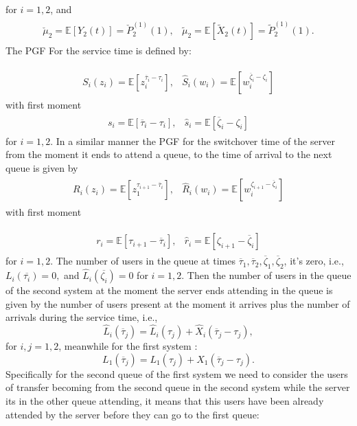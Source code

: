 \documentclass{article}
\newcommand{\esp}{\mathbb{E}}
\begin{document}
for $i=1,2$, and
\begin{eqnarray*} 
\begin{array}{cc}
\check{\mu}_{2}=\esp\left[Y_{2}\left(t\right)\right]=\check{P}_{2}^{(1)}
\left(1\right),&
\tilde{\mu}_{2}=\esp\left[\tilde{X}_{2}\left(t\right)\right]
=\tilde{P}_{2}^{(1)}\left(1\right).
\end{array}
\end{eqnarray*} The PGF For the service time is defined by:

\begin{eqnarray*}
\begin{array}{cc}
S_{i}\left(z_{i}\right)=\esp\left[z_{i}^{\overline{\tau}_{i}-\tau_{i}}
\right], &
\hat{S}_{i}\left(w_{i}\right)=\esp\left[w_{i}^{\overline{\zeta}_{i}-\zeta_{i}}\right]
\end{array}
\end{eqnarray*} with first moment 
\begin{eqnarray*}
\begin{array}{cc}
s_{i}=\esp\left[\overline{\tau}_{i}-\tau_{i}\right],&\hat{s}_{i}=\esp\left[\overline{\zeta}_{i}-\zeta_{i}\right]
\end{array}
\end{eqnarray*} for $i=1,2$. In a similar manner the PGF for the switchover time of the server from the moment it ends to attend a queue, to the time of arrival to the next queue is given by 
\begin{eqnarray*}
\begin{array}{cc}
R_{i}\left(z_{i}\right)=\esp\left[z_{1}^{\tau_{i+1}-\overline{\tau}_{i}}\right],&
\hat{R}_{i}\left(w_{i}\right)=\esp\left[w_{i}^{\zeta_{i+1}-\overline{\zeta}_{i}}\right]
\end{array}
\end{eqnarray*} with first moment 

\begin{eqnarray*}
\begin{array}{cc}
r_{i}=\esp\left[\tau_{i+1}-\overline{\tau}_{i}\right],&
\hat{r}_{i}=\esp\left[\zeta_{i+1}-\overline{\zeta}_{i}\right]
\end{array}
\end{eqnarray*} for $i=1,2$. The number of users in the queue at times $\overline{\tau}_{1},\overline{\tau}_{2}, \overline{\zeta}_{1},\overline{\zeta}_{2}$, it's zero, i.e.,
 $L_{i}\left(\overline{\tau_{i}}\right)=0,$ and $\hat{L}_{i}\left(\overline{\zeta_{i}}\right)=0$ for $i=1,2$. Then the number of users in the queue of the second system at the moment the server ends attending in the queue is given by the number of users present at the moment it arrives plus the number of arrivals during the service time, i.e.,
$$\hat{L}_{i}\left(\overline{\tau}_{j}\right)=\hat{L}_{i}\left(\tau_{j}\right)+\hat{X}_{i}\left(\overline{\tau}_{j}-\tau_{j}\right),$$
for $i,j=1,2$, meanwhile for the first system : $$L_{1}\left(\overline{\tau}_{j}\right)=L_{1}\left(\tau_{j}\right)+X_{1}\left(\overline{\tau}_{j}-\tau_{j}\right).$$ Specifically for the second queue of the first system we need to consider the users of transfer becoming from the second queue in the second system while the server its in the other queue attending, it means that this users have been already attended by the server before they can go to the first queue:
\end{document}
